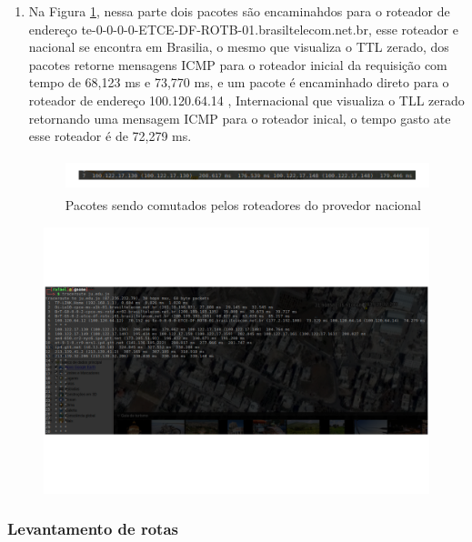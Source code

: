 \documentclass[
	article,			%
	11pt,				%
	oneside,			%
	a4paper,			%
	english,			%
	brazil,				%
	sumario=tradicional
	]{abntex2}
\begin{document}
\begin{enumerate}
		\item Na Figura \ref{rota-7}, nessa parte dois pacotes são encaminahdos para o roteador de endereço te-0-0-0-0-ETCE-DF-ROTB-01.brasiltelecom.net.br, esse roteador e nacional se encontra em Brasilia, o mesmo que visualiza o TTL zerado, dos pacotes retorne mensagens ICMP para o roteador inicial da requisição com tempo de 68,123 ms e 73,770 ms, e um pacote é encaminhado direto para o roteador de endereço 100.120.64.14 , Internacional que visualiza o TLL zerado retornando uma mensagem ICMP para o roteador inical, o tempo gasto ate esse roteador é de 72,279 ms.
	
	\begin{figure}[!h]
		\centering
		\includegraphics[width=17cm,height=1cm]{./rota-7.png}
		\caption{Pacotes sendo comutados pelos roteadores do provedor nacional}
		\label{rota-7}
	\end{figure}
	 	
 \end{enumerate}

	 
\begin{figure}[!h]
	\centering
	\includegraphics[scale=0.1]{./trauceroute-1.png}

	\label{Rotulo}
\end{figure}

\subsubsection{Levantamento de rotas}
\end{document}
